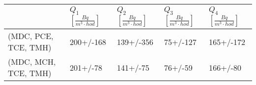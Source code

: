 \begin{tabular}{lllll}
\toprule
{} & $Q_1$ $\left[\si{\frac{Bq}{m^3\cdot hod}}\right]$ & $Q_2$ $\left[\si{\frac{Bq}{m^3\cdot hod}}\right]$ & $Q_3$ $\left[\si{\frac{Bq}{m^3\cdot hod}}\right]$ & $Q_4$ $\left[\si{\frac{Bq}{m^3\cdot hod}}\right]$ \\
\midrule
(MDC, PCE, TCE, TMH) & 200+/-168 &139+/-356 &75+/-127 &165+/-172 \\
(MDC, MCH, TCE, TMH) &  201+/-78 & 141+/-75 & 76+/-59 & 166+/-80 \\
\bottomrule
\end{tabular}
